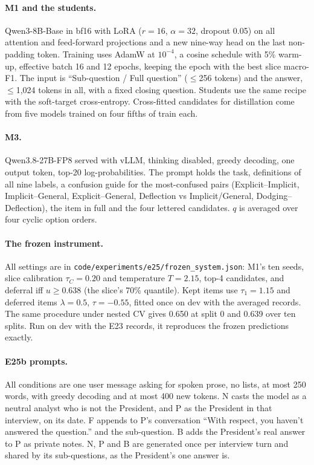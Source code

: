 \paragraph{M1 and the students.}
Qwen3-8B-Base in bf16 with LoRA ($r = 16$, $\alpha = 32$, dropout 0.05) on all attention and feed-forward projections and a new nine-way head on the last non-padding token. Training uses AdamW at $10^{-4}$, a cosine schedule with 5\% warm-up, effective batch 16 and 12 epochs, keeping the epoch with the best slice macro-F1. The input is ``Sub-question / Full question'' ($\le$256 tokens) and the answer, $\le$1,024 tokens in all, with a fixed closing question.
Students use the same recipe with the soft-target cross-entropy.
Cross-fitted candidates for distillation come from five models trained on four fifths of train each.

\paragraph{M3.}
Qwen3.8-27B-FP8 served with vLLM, thinking disabled, greedy decoding, one output token, top-20 log-probabilities.
The prompt holds the task, definitions of all nine labels, a confusion guide for the most-confused pairs (Explicit--Implicit, Implicit--General, Explicit--General, Deflection vs Implicit/General, Dodging--Deflection), the item in full and the four lettered candidates.
$q$ is averaged over four cyclic option orders.

\paragraph{The frozen instrument.}
All settings are in \texttt{code/experiments/e25/frozen\_system.json}: M1's ten seeds, slice calibration $\tau_C = 0.20$ and temperature $T = 2.15$, top-4 candidates, and deferral iff $u \ge 0.638$ (the slice's 70\% quantile). Kept items use $\tau_1 = 1.15$ and deferred items $\lambda = 0.5$, $\tau = -0.55$, fitted once on dev with the averaged records. The same procedure under nested CV gives 0.650 at split 0 and 0.639 over ten splits.
Run on dev with the E23 records, it reproduces the frozen predictions exactly.

\paragraph{E25b prompts.}
All conditions are one user message asking for spoken prose, no lists, at most 250 words, with greedy decoding and at most 400 new tokens.
N casts the model as a neutral analyst who is not the President, and P as the President in that interview, on its date. F appends to P's conversation ``With respect, you haven't answered the question.'' and the sub-question. B adds the President's real answer to P as private notes.
N, P and B are generated once per interview turn and shared by its sub-questions, as the President's one answer is.

